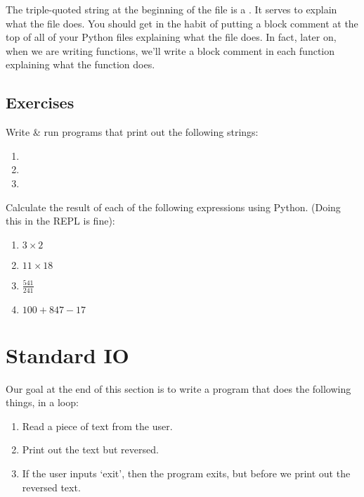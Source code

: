 \begin{remark}
  The triple-quoted string at the beginning of the file is a
  . It serves to explain what the file does. You
  should get in the habit of putting a block comment at the top of all
  of your Python files explaining what the file does. In fact, later
  on, when we are writing functions, we'll write a block comment in
  each function explaining what the function does.
\end{remark}

\subsection{Exercises}

\begin{exercise}
  Write \& run programs that print out the following strings:

  \begin{enumerate}
  \item {}
  \item {}
  \item {}
  \end{enumerate}
\end{exercise}

\begin{exercise}
  Calculate the result of each of the following expressions using
  Python. (Doing this in the REPL is fine):

  \begin{enumerate}
  \item $3 \times 2$
  \item $11 \times 18$
  \item $\frac{541}{241}$
  \item $100 + 847 - 17$
  \end{enumerate}
\end{exercise}

\section{Standard IO}

Our goal at the end of this section is to write a program that does
the following things, in a loop:

\begin{enumerate}
\item Read a piece of text from the user.
\item Print out the text but reversed.
\item If the user inputs `exit', then the program exits, but before
  we print out the reversed text.
\end{enumerate}



